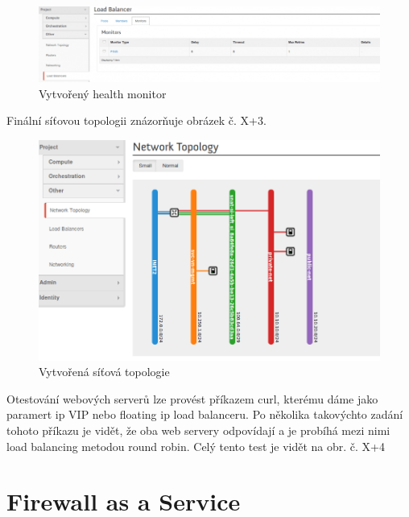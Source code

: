 \begin{figure}[h]
\begin{centering}
\includegraphics[scale=0.45]{images/lbaas3}
\par\end{centering}
\caption{Vytvořený health monitor\label{fig:lbaas3}}
\end{figure}

Finální síťovou topologii znázorňuje obrázek č. X+3. 


\begin{figure}[h]
\begin{centering}
\includegraphics[scale=0.45]{images/lbaas_topologie}
\par\end{centering}
\caption{Vytvořená síťová topologie\label{fig:lbaas_topologie}}
\end{figure}

Otestování webových serverů lze provést příkazem curl, kterému dáme jako paramert ip VIP nebo floating ip load balanceru. Po několika takovýchto zadání tohoto příkazu je vidět, že oba web servery odpovídají a je probíhá mezi nimi load balancing metodou round robin.  Celý tento test je vidět na obr. č. X+4

\section{Firewall as a Service}

